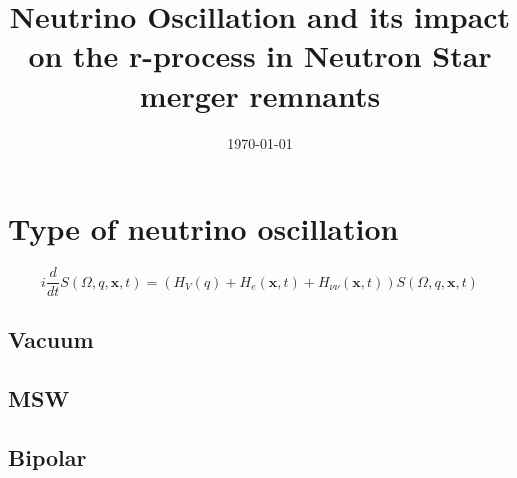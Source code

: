 \documentclass[
reprint,
preprintnumbers,
 amsmath,
 amssymb,
 aps,
onecolumn,
prd,
]{revtex4-2}
\begin{document}

\title{Neutrino Oscillation and its impact on the r-process in Neutron Star merger remnants}%


\date{\today}%

\begin{abstract}

\end{abstract}

\maketitle
\section{Type of neutrino oscillation}
\begin{equation}
i \frac{d}{d t} S(\Omega, q, \mathbf{x}, t)=\left(H_{V}(q)+H_{e}(\mathbf{x}, t)+H_{\nu \nu}(\mathbf{x}, t)\right) S(\Omega, q, \mathbf{x}, t)
\end{equation}
\subsection{Vacuum}
\subsection{MSW}
\subsection{Bipolar}
\end{document}
